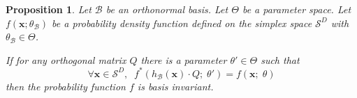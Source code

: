 \documentclass[10pt, a4paper]{article}
\newtheorem{prop}{Proposition}
\begin{document}
\begin{prop}
Let $\mathcal{B}$ be an orthonormal basis. Let  $\Theta$ be a parameter space. Let $f(\textbf{x} ; \theta_{\mathcal{B}})$ be a probability density function defined on the simplex space $\mathcal{S}^D$ with $\theta_{\mathcal{B}} \in \Theta$.

If for any orthogonal matrix $Q$ there is a parameter $\theta' \in \Theta$ such that 
\[
\forall \textbf{x} \in \mathcal{S}^D, \;\; f^*(h_\mathcal{B}(\textbf{x}) \cdot Q ;\; \theta') = f(\textbf{x};\; \theta) 
\]
then the probability function $f$ is basis invariant.
\end{prop}
\end{document}
